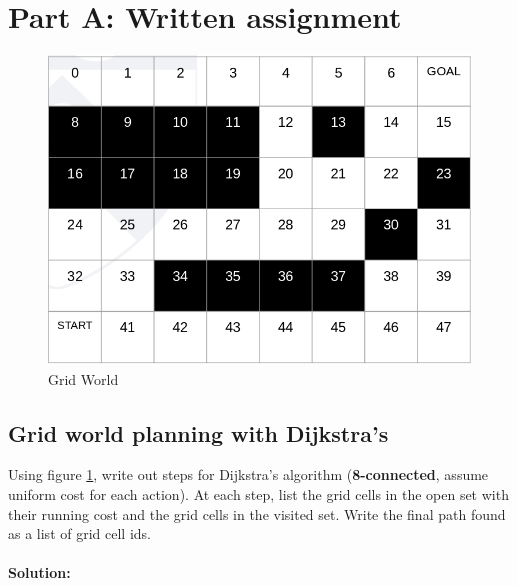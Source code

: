 \documentclass[letta4 paper]{article}
\numberwithin{equation}{section}
\newcommand{\0}{\mathbf{0}}
\begin{document}
	\section{Part A: Written assignment}
	\begin{figure}[!hb]
		\begin{center}
			\includegraphics[scale=0.4]{grid_world.png}
		\end{center}
		\caption{Grid World}
		\label{fig:gridworld}
	\end{figure}
	\subsection{Grid world planning with Dijkstra's}
	Using figure \ref{fig:gridworld}, write out steps for Dijkstra's algorithm (\textbf{8-connected}, assume uniform cost for each action). At each step, list the grid cells in the open set with their running cost and the grid cells in the visited set. Write the final path found as a list of grid cell ids.\\
	\\
	\textbf{Solution:}\\
	
\end{document}
